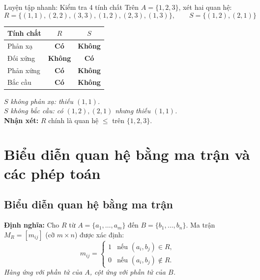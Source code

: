 \documentclass[12pt,a4paper]{article}
\newcommand{\yes}{\textcolor{AccentGreen}{\textbf{Có}}}
\newcommand{\no}{\textcolor{AccentRed}{\textbf{Không}}}
\begin{document}
\begin{baitap}{Luyện tập nhanh: Kiểm tra 4 tính chất}
Trên $A = \{1, 2, 3\}$, xét hai quan hệ:
\[
  R = \{(1, 1), (2, 2), (3, 3), (1, 2), (2, 3), (1, 3)\}, \qquad S = \{(1, 2), (2, 1)\}
\]
\noindent
\begin{minipage}[c]{0.46\textwidth}
\centering
\renewcommand{\arraystretch}{1.2}
\begin{tabular}{lcc}
\toprule
\textbf{Tính chất} & $R$ & $S$ \\
\midrule
Phản xạ & \yes & \no \\
Đối xứng & \no & \yes \\
Phản xứng & \yes & \no \\
Bắc cầu & \yes & \no \\
\bottomrule
\end{tabular}
\end{minipage}
\hfill
\begin{minipage}[c]{0.50\textwidth}
\textit{$S$ không phản xạ: thiếu $(1, 1)$.}\\[4pt]
\textit{$S$ không bắc cầu: có $(1, 2), (2, 1)$ nhưng thiếu $(1, 1)$.}\\[6pt]
\textbf{Nhận xét:} $R$ chính là quan hệ $\le$ trên $\{1, 2, 3\}$.
\end{minipage}
\end{baitap}

\section{Biểu diễn quan hệ bằng ma trận và các phép toán}

\subsection{Biểu diễn quan hệ bằng ma trận}

\textbf{\textcolor{AccentRed}{Định nghĩa:}} Cho $R$ từ $A = \{a_1, \dots, a_m\}$ đến $B = \{b_1, \dots, b_n\}$. Ma trận $M_R = [m_{ij}]$ (cỡ $m \times n$) được xác định:
\[
  m_{ij} = \begin{cases}
    1 & \text{nếu } (a_i, b_j) \in R, \\
    0 & \text{nếu } (a_i, b_j) \notin R.
  \end{cases}
\]
\textit{Hàng ứng với phần tử của $A$, cột ứng với phần tử của $B$.}
\end{document}
